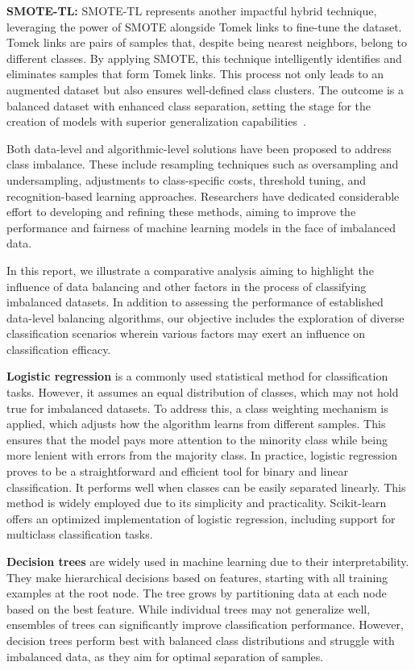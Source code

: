\textbf{SMOTE-TL:} SMOTE-TL represents another impactful hybrid technique, leveraging the power of SMOTE alongside Tomek links to fine-tune the dataset. Tomek links are pairs of samples that, despite being nearest neighbors, belong to different classes. By applying SMOTE, this technique intelligently identifies and eliminates samples that form Tomek links. This process not only leads to an augmented dataset but also ensures well-defined class clusters. The outcome is a balanced dataset with enhanced class separation, setting the stage for the creation of models with superior generalization capabilities~\cite{Fotouhi2019,Xu2020,Khushi2021}.

Both data-level and algorithmic-level solutions have been proposed to address class imbalance.
These include resampling techniques such as oversampling and undersampling, adjustments to class-specific costs, threshold tuning, and recognition-based learning approaches. Researchers have dedicated considerable effort to developing and refining these methods, aiming to improve the performance and fairness of machine learning models in the face of imbalanced data.

In this report, we illustrate a comparative analysis aiming to highlight the influence of data balancing and other factors in the process of classifying imbalanced datasets. In addition to assessing the performance of established data-level balancing algorithms, our objective includes the exploration of diverse classification scenarios wherein various factors may exert an influence on classification efficacy.


\textbf{Logistic regression} is a commonly used statistical method for classification tasks. However, it assumes an equal distribution of classes, which may not hold true for imbalanced datasets. To address this, a class weighting mechanism is applied, which adjusts how the algorithm learns from different samples. This ensures that the model pays more attention to the minority class while being more lenient with errors from the majority class.
In practice, logistic regression proves to be a straightforward and efficient tool for binary and linear classification. It performs well when classes can be easily separated linearly. This method is widely employed due to its simplicity and practicality. Scikit-learn offers an optimized implementation of logistic regression, including support for multiclass classification tasks.


\textbf{Decision trees} are widely used in machine learning due to their interpretability. They make hierarchical decisions based on features, starting with all training examples at the root node. The tree grows by partitioning data at each node based on the best feature. While individual trees may not generalize well, ensembles of trees can significantly improve classification performance. However, decision trees perform best with balanced class distributions and struggle with imbalanced data, as they aim for optimal separation of samples.


